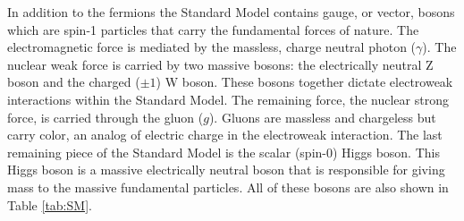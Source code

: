 In addition to the fermions the Standard Model contains gauge, or vector, bosons which are spin-1 particles that carry the fundamental forces of nature.  The electromagnetic force is mediated by the massless, charge neutral photon ($\gamma$). The nuclear weak force is carried by two massive bosons: the electrically neutral Z boson and the charged ($\pm 1$) W boson.  These bosons together dictate electroweak interactions within the Standard Model.  The remaining force, the nuclear strong force, is carried through the gluon ($g$).  Gluons are massless and chargeless but carry color, an analog of electric charge in the electroweak interaction.  The last remaining piece of the Standard Model is the scalar (spin-0) Higgs boson.  This Higgs boson is a massive electrically neutral boson that is responsible for giving mass to the massive fundamental particles.  All of these bosons are also shown in Table \ref{tab:SM}.  

